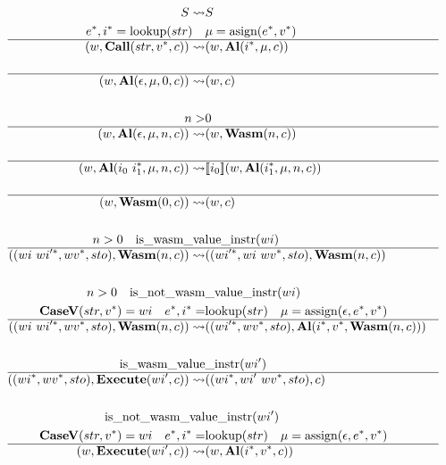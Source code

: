 \begin{align*}
\newline \\
  S \leadsto& S
%
\newline \\
  \seq e, \seq i = \text{lookup}(str) \quad& \mu = \text{asign}(\seq e, \seq v) \\
  \hline
  (w, \call (str, \seq v, c)) \leadsto& (w, \al (\seq i, \mu, c)) \\
%
\newline \\
  \hline
  (w, \al (\epsilon, \mu, 0, c)) \leadsto& (w, c) \\
%
\newline \\
  n >& 0 \\
  \hline
  (w, \al (\epsilon, \mu, n, c)) \leadsto& (w, \wasm (n, c)) \\
%
\newline \\
  \hline
  (w, \al (i_0 ~ \seq{i_1}, \mu, n, c)) \leadsto& \sem{i_0}(w, \al (\seq{i_1}, \mu, n, c)) \\
%
\newline \\
  \hline
  (w, \wasm (0, c)) \leadsto& (w, c) \\
%
\newline \\
  n > 0 \quad \text{is\_wasm\_va}&\text{lue\_instr}(wi) \\
  \hline
  ((wi ~ \seq{wi'}, \seq{wv}, sto), \wasm (n, c))
  \leadsto&
  ((\seq{wi'}, wi ~ \seq{wv}, sto), \wasm (n, c)) \\
%
\newline \\
  n > 0 \quad \text{is\_not\_wasm}&\text{\_value\_instr}(wi) \\
  \casev (str, \seq v) = wi \quad
  \seq e, \seq i =& \text{lookup}(str) \quad
  \mu = \text{assign}(\epsilon, \seq e, \seq v) \\
  \hline
  ((wi ~ \seq{wi'}, \seq{wv}, sto), \wasm (n, c))
  \leadsto&
  ((\seq{wi'}, \seq{wv}, sto), \al (\seq i, \seq v, \wasm (n, c))) \\
%
\newline \\
  \text{is\_wasm\_value}&\text{\_instr}(wi') \\
  \hline
  ((\seq{wi}, \seq{wv}, sto), \exe (wi', c))
  \leadsto&
  ((\seq{wi}, wi' ~ \seq{wv}, sto), c) \\
%
\newline \\
  \text{is\_not\_wasm\_val}&\text{ue\_instr}(wi') \\
  \casev (str, \seq v) = wi \quad
  \seq e, \seq i =& \text{lookup}(str) \quad
  \mu = \text{assign}(\epsilon, \seq e, \seq v) \\
  \hline
  (w, \exe (wi', c)) \leadsto& (w, \al (\seq i, \seq v, c)) \\
\end{align*}



